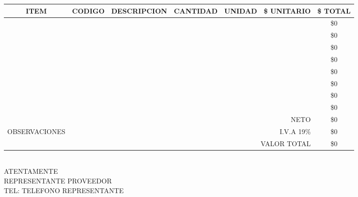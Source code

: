 \documentclass[10pt,letterpaper]{report}
\begin{document}
\justify
\begin{table}[ht]
\justify
\setlength{\tabcolsep}{10pt}
\renewcommand{\arraystretch}{1.3}
\begin{tabular}{ l l l l l l l}
\hline
  \multicolumn{1}{|c|}{\cellcolor{cyan!25}ITEM} 
		& \multicolumn{1}{c|}{\cellcolor{cyan!25}CODIGO} 
		& \multicolumn{1}{c|}{\cellcolor{cyan!25}DESCRIPCION} 
		& \multicolumn{1}{c|}{\cellcolor{cyan!25}CANTIDAD} 
		& \multicolumn{1}{c|}{\cellcolor{cyan!25}UNIDAD} 
		& \multicolumn{1}{c|}{\cellcolor{cyan!25}\$ UNITARIO}  
		& \multicolumn{1}{c|}{\cellcolor{cyan!25}\$ TOTAL} \\ \hline
	\multicolumn{1}{|c|}{} 
		& \multicolumn{1}{c|}{} 
		& \multicolumn{1}{c|}{} 
		& \multicolumn{1}{c|}{} 
		& \multicolumn{1}{c|}{} 
		& \multicolumn{1}{c|}{} 
		& \multicolumn{1}{c|}{\$0}  \\ \hline
  \multicolumn{1}{|c|}{} 
		& \multicolumn{1}{c|}{} 
		& \multicolumn{1}{c|}{} 
		& \multicolumn{1}{c|}{} 
		& \multicolumn{1}{c|}{} 
		& \multicolumn{1}{c|}{} 
		& \multicolumn{1}{c|}{\$0}  \\ \hline
  \multicolumn{1}{|c|}{} 
		& \multicolumn{1}{c|}{} 
		& \multicolumn{1}{c|}{} 
		& \multicolumn{1}{c|}{} 
		& \multicolumn{1}{c|}{} 
		& \multicolumn{1}{c|}{} 
		& \multicolumn{1}{c|}{\$0}  \\ \hline
	\multicolumn{1}{|c|}{} 
		& \multicolumn{1}{c|}{} 
		& \multicolumn{1}{c|}{} 
		& \multicolumn{1}{c|}{} 
		& \multicolumn{1}{c|}{} 
		& \multicolumn{1}{c|}{} 
		& \multicolumn{1}{c|}{\$0}  \\ \hline
	\multicolumn{1}{|c|}{} 
		& \multicolumn{1}{c|}{} 
		& \multicolumn{1}{c|}{} 
		& \multicolumn{1}{c|}{} 
		& \multicolumn{1}{c|}{} 
		& \multicolumn{1}{c|}{} 
		& \multicolumn{1}{c|}{\$0}  \\ \hline
	\multicolumn{1}{|c|}{} 
		& \multicolumn{1}{c|}{} 
		& \multicolumn{1}{c|}{} 
		& \multicolumn{1}{c|}{} 
		& \multicolumn{1}{c|}{} 
		& \multicolumn{1}{c|}{} 
		& \multicolumn{1}{c|}{\$0}  \\ \hline
	\multicolumn{1}{|c|}{} 
		& \multicolumn{1}{c|}{} 
		& \multicolumn{1}{c|}{} 
		& \multicolumn{1}{c|}{} 
		& \multicolumn{1}{c|}{} 
		& \multicolumn{1}{c|}{} 
		& \multicolumn{1}{c|}{\$0}  \\ \hline
	\multicolumn{1}{|c|}{} 
		& \multicolumn{1}{c|}{} 
		& \multicolumn{1}{c|}{} 
		& \multicolumn{1}{c|}{} 
		& \multicolumn{1}{c|}{} 
		& \multicolumn{1}{c|}{} 
		& \multicolumn{1}{c|}{\$0}  \\ \hline  %
	\multicolumn{1}{|l}{}
    & \multicolumn{5}{r|}{NETO}
		& \multicolumn{1}{c|}{\$0}  \\ 
	\multicolumn{1}{|l}{OBSERVACIONES}
    & \multicolumn{5}{r|}{I.V.A 19\%}
		& \multicolumn{1}{c|}{\$0}  \\
	\multicolumn{1}{|l}{}
    & \multicolumn{5}{r|}{VALOR TOTAL}
		& \multicolumn{1}{c|}{\$0}  \\
\hline
\end{tabular}
\end{table}


\justify
\\
ATENTAMENTE \\
REPRESENTANTE PROVEEDOR \\
TEL: TELEFONO REPRESENTANTE \\
\end{document}
